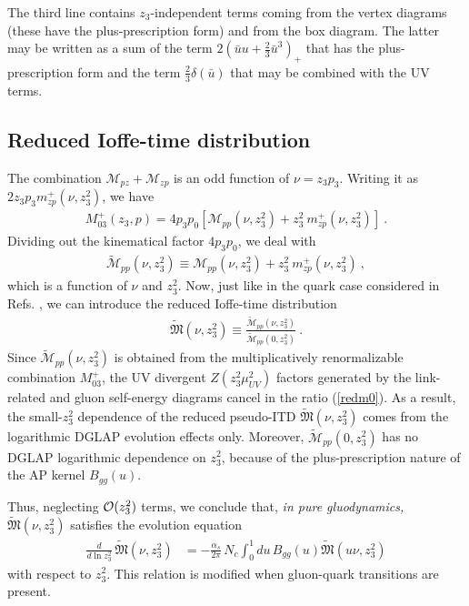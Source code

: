 The third line
contains $z_3$-independent terms coming from the vertex diagrams
(these have the plus-prescription form) and from the box diagram.
The latter may be written as a sum of the term $2 \left (\bar uu + \frac{2}{3}\bar u^3 \right )_{+}$
that has the plus-prescription form and the term $\frac23 \delta (\bar u)$ that
may be combined with the UV terms.

\subsection{Reduced Ioffe-time distribution}

The combination $\mathcal{M}_{pz} +\mathcal{M}_{zp}$ is an odd function of $\nu =z_3 p_3$.
Writing it as $2 z_3 p_3 m^+_{zp} (\nu, z_3^2)$, we have
\begin{align}
M_{03} ^+(z_3, p) = 4 p_3 p_0 [ \mathcal{M}_{pp} (\nu, z_3^2 ) +
z_3^2 \ m^+_{zp} (\nu, z_3^2 )] \ .
\label{M03p}
\end{align}
Dividing out the kinematical factor $4 p_3 p_0$, we deal with
\begin{align}
\widetilde{\mathcal{M}}_{pp}(\nu, z_3^2 ) \equiv
\mathcal{M}_{pp}(\nu, z_3^2 ) +
z_3^2 \ m^+_{zp} (\nu, z_3^2 ) \ ,
\end{align}
which is a function of $\nu$ and $z_3^2$.
Now, just like in the quark case considered in Refs. \cite{Radyushkin:2017cyf,Orginos:2017kos}, we can introduce
the reduced Ioffe-time distribution
\begin{align}
\widetilde{\mathfrak M} (\nu, z_3^2) \equiv \frac{\widetilde{\mathcal{M}}_{pp}(\nu, z_3^2)}{\widetilde{\mathcal{M}}_{pp} (0, z_3^2)} \ .
\label{redm0}
\end{align}
Since $\widetilde{\mathcal{M}}_{pp}(\nu, z_3^2)$ is obtained from the multiplicatively
renormalizable combination $M_{03} ^+$,
the UV divergent $Z(z_3^2 \mu^2_{UV})$ factors generated by the link-related and gluon self-energy diagrams
cancel in the ratio (\ref{redm0}). As a result, the small-$z_3^2$ dependence of the reduced
pseudo-ITD $\widetilde{\mathfrak M} (\nu, z_3^2)$ comes from the logarithmic DGLAP evolution
effects only.
Moreover, $\widetilde{\mathcal{M}}_{pp}(0, z_3^2)$
has no DGLAP logarithmic dependence on $z_3^2$,
because of the plus-prescription nature of the AP kernel $B_{gg} (u)$.

Thus, neglecting ${\cal O} (z_3^2)$ terms, we conclude that,
{\it in pure gluodynamics, }
$\widetilde{\mathfrak M} (\nu, z_3^2)$ satisfies the evolution equation
\begin{align}
\frac{d}{d \ln z_3^2} \,
\widetilde{\mathfrak M} (\nu, z_3^2) &= - \frac{\alpha_s}{2\pi} \, N_c
\int_0^1 du \, B_{gg} (u) \widetilde{\mathfrak M} (u \nu, z_3^2)
\label{EE}
\end{align}
with respect to
$z_3^2$.
This relation is modified when gluon-quark transitions are present.

